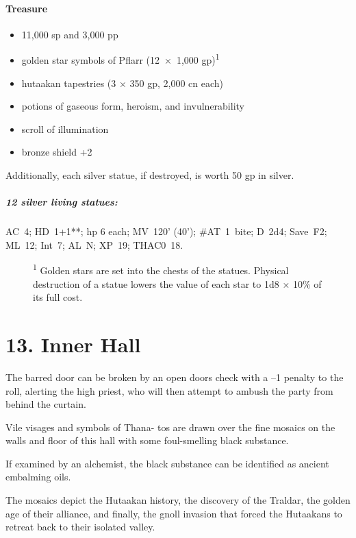 \documentclass[english,11pt,openany,letterpaper,twocolumn]{book}
\begin{document}
\skipline
\paragraph{Treasure}
\begin{itemize}[leftmargin=*]
	\item 11,000 sp and 3,000 pp
	\item golden star symbols of Pflarr (12~×~1,000 gp)\textsuperscript{1}
	\item hutaakan tapestries (3 × 350 gp, 2,000 cn each)
	\item potions of gaseous form, heroism, and invulnerability
	\item scroll of illumination
	\item bronze shield +2
\end{itemize}

Additionally, each silver statue, if destroyed, is worth 50 gp in silver.

\begin{textbox}
	\subparagraph{12 silver living statues:} AC~4; HD~1+1**; hp 6 each; MV~120' (40'); \#AT~1~bite; D~2d4; Save~F2; ML~12; Int~7; AL~N; XP~19; THAC0~18.
\end{textbox}

\begin{figure}[b]
\color{darkgray}
\uln[8]

\textsuperscript{1} Golden stars are set into the chests of the statues. Physical destruction of a statue lowers the value of each star to 1d8 × 10\% of its full cost.
\end{figure}


\hypertarget{room13}{}
\section{13. Inner Hall}

The barred door can be broken by an open doors check with a --1 penalty to the roll, alerting the high priest, who will then attempt to ambush the party from behind the curtain.


\tab Vile visages and symbols of Thana- tos are drawn over the fine mosaics on the walls and floor of this hall with some foul-smelling black substance.

\tab If examined by an alchemist, the black substance can be identified as ancient embalming oils.

\tab The mosaics depict the Hutaakan history, the discovery of the Traldar, the golden age of their alliance, and finally, the gnoll invasion that forced the Hutaakans to retreat back to their isolated valley.
\end{document}
